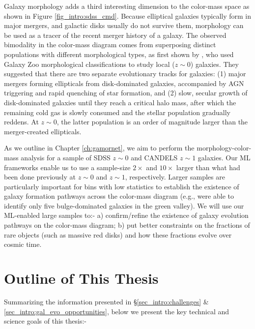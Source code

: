 Galaxy morphology adds a third interesting dimension to the color-mass space as shown in Figure \ref{fig_intro:sdss_cmd}. Because elliptical galaxies typically form in major mergers, and galactic disks usually do not survive them, 
morphology can be used as a tracer of the recent merger history of a galaxy. The observed bimodality in the color-mass diagram comes from superposing distinct populations with different morphological types, as first shown by \citet{Schawinski2014TheGalaxies}, who used Galaxy Zoo morphological classifications to study local ($z\sim0$) galaxies. They suggested that there are two separate evolutionary tracks for galaxies: (1) major mergers forming ellipticals from disk-dominated galaxies, accompanied by AGN triggering and rapid quenching of star formation, and (2) slow, secular growth of disk-dominated galaxies until they reach a critical halo mass, after which the remaining cold gas is slowly consumed and the stellar population gradually reddens. At $z\sim0$, the latter population is an order of magnitude larger than the merger-created ellipticals. 

As we outline in Chapter \ref{ch:gamornet}, we aim to perform the morphology-color-mass analysis for a sample of SDSS $z\sim0$ and CANDELS $z\sim1$ galaxies. Our ML frameworks enable us to use a sample-size $2\times$ and $10\times$ larger than what had been done previously at $z\sim0$ and $z\sim1$, respectively. Larger samples are particularly important for bins with low statistics to establish the existence of galaxy formation pathways across the color-mass diagram (e.g., \cite{powell_17} were able to identify only five bulge-dominated galaxies in the green valley). We will use our ML-enabled large samples to:- a) confirm/refine the existence of galaxy evolution pathways on the color-mass diagram; b) put better constraints on the fractions of rare objects (such as massive red disks) and how these fractions evolve over cosmic time. 


\section{Outline of This Thesis} \label{sec_intro:thesis_outline}

Summarizing the information presented in \S \ref{sec_intro:challenges} \& \ref{sec_intro:gal_evo_opportunities}, below we present the key technical and science goals of this thesis:-

